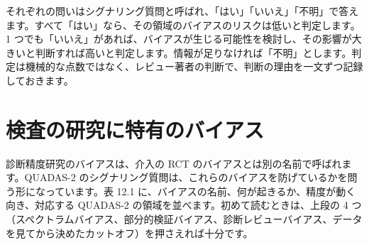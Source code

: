 それぞれの問いはシグナリング質問と呼ばれ、「はい」「いいえ」「不明」で答えます。すべて「はい」なら、その領域のバイアスのリスクは低いと判定します。1 つでも「いいえ」があれば、バイアスが生じる可能性を検討し、その影響が大きいと判断すれば高いと判定します。情報が足りなければ「不明」とします。判定は機械的な点数ではなく、レビュー著者の判断で、判断の理由を一文ずつ記録しておきます。

\section{検査の研究に特有のバイアス}
\label{sec:12-5}

診断精度研究のバイアスは、介入の RCT のバイアスとは別の名前で呼ばれます。QUADAS-2 のシグナリング質問は、これらのバイアスを防げているかを問う形になっています。表 12.1 に、バイアスの名前、何が起きるか、精度が動く向き、対応する QUADAS-2 の領域を並べます。初めて読むときは、上段の 4 つ（スペクトラムバイアス、部分的検証バイアス、診断レビューバイアス、データを見てから決めたカットオフ）を押さえれば十分です。

